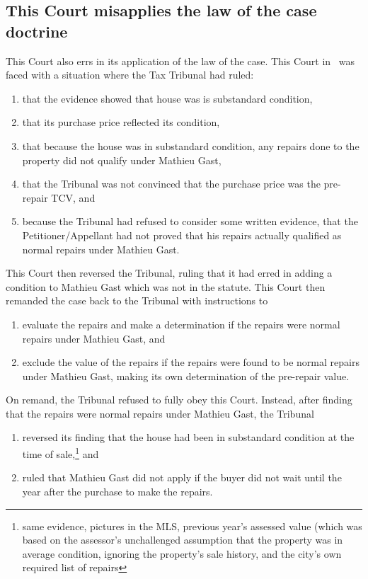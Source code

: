 \documentclass[12pt,\documentclassflag]{michiganCourtOfAppealsBrief}
\begin{document}
 \subsection{This Court misapplies the law of the case doctrine}

 This Court also errs in its application of the law of the case. This Court in \cite{Patru 1}\ was faced with a situation where the Tax Tribunal had ruled:

 \begin{enumerate}
  \item that the evidence showed that house was is substandard condition, 
 \item that its purchase price reflected its condition,
 \item that because the house was in substandard condition, any repairs done to the property did not qualify under Mathieu Gast, 
 \item that the Tribunal was not convinced that the purchase price was the pre-repair TCV, and
 \item because the Tribunal had refused to consider some written evidence, that the Petitioner/Appellant had not proved that his repairs actually qualified as normal repairs under Mathieu Gast. 
 \end{enumerate}

 This Court then reversed the Tribunal, ruling that it had erred in adding a condition to Mathieu Gast which was not in the statute. This Court then remanded the case back to the Tribunal with instructions to

 \begin{enumerate}
 \item evaluate the repairs and make a determination if the repairs were normal repairs under Mathieu Gast, and
 \item exclude the value of the repairs if the repairs were found to be normal repairs under Mathieu Gast, making its own determination of the pre-repair value. 
 \end{enumerate}

 On remand, the Tribunal refused to fully obey this Court. Instead, after finding that the repairs were normal repairs under Mathieu Gast, the Tribunal

 \begin{enumerate}
 \item reversed its finding that the house had been in substandard condition at the time of sale,\footnote{same evidence, pictures in the MLS, previous year's assessed value (which was based on the assessor's unchallenged assumption that the property was in average condition, ignoring the property's sale history, and the city's own required list of repairs} and
 \item ruled that Mathieu Gast did not apply if the buyer did not wait until the year after the purchase to make the repairs.
 \end{enumerate}
\end{document}
